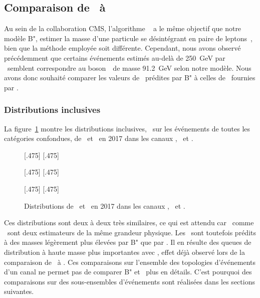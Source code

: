 \subsection{Comparaison de \mml\ à \msv}
Au sein de la collaboration CMS, l'algorithme \SVFIT~\cite{SVFit_Bianchini_2014} a le même objectif que notre modèle B",
estimer la masse d'une particule se désintégrant en paire de leptons~\tau,
bien que la méthode employée soit différente.
Cependant, nous avons observé précédemment que certains événements estimés au-delà de \SI{250}{\GeV} par \SVFIT\ semblent correspondre au boson~\Zboson\ de masse \SI{91.2}{\GeV} selon notre modèle.
Nous avons donc souhaité comparer
les valeurs de \mml\ prédites par B"
à celles de \msv\ fournies par \SVFIT.
\subsubsection{Distributions inclusives}
La figure~\ref{fig-svfit_vs_ml_2017}
montre les distributions inclusives, \ie\ sur les événements de toutes les catégories confondues, de \msv\ et \mml\ en 2017 dans les canaux \tauh\tauh, \ele\tauh\ et \ele\mu.
\begin{figure}[p]
\centering

[.475\textwidth]
{}
\hfill
{}[.475\textwidth]
{}

[.475\textwidth]
{}
\hfill
{}[.475\textwidth]
{}

[.475\textwidth]
{}
\hfill
{}[.475\textwidth]
{}

\caption[Distributions de \msv\ et \mml\ dans les canaux \tauh\tauh, \ele\tauh\ et \ele\mu.]{Distributions de \msv\ et \mml\ en 2017 dans les canaux \tauh\tauh, \ele\tauh\ et \ele\mu.}
\label{fig-svfit_vs_ml_2017}
\end{figure}
Ces distributions sont deux à deux très similaires,
ce qui est attendu car \msv\ comme \mml\ sont deux estimateurs de la même grandeur physique.
Les \ftauhs\ sont toutefois prédits à des masses légèrement plus élevées par B" que par \SVFIT.
Il en résulte des queues de distribution à haute masse plus importantes avec \mml,
effet déjà observé lors de la comparaison de \mml\ à \mTtot.
Ces comparaisons sur l'ensemble des topologies d'événements d'un canal ne permet pas de comparer B" et \SVFIT\ plus en détails.
C'est pourquoi des comparaisons sur des sous-ensembles d'événements sont réalisées dans les sections suivantes.
